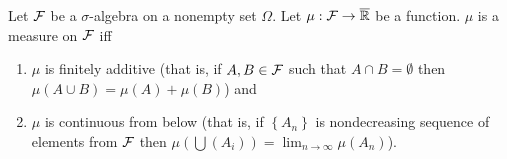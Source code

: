 \begin{theorem}
    Let ${\cal F}$ be a $\sigma$-algebra on a nonempty set $\Omega$. Let $\mu : {\cal F} \to \overline {\mathbb R}$ be a function. $\mu$ is a measure on ${\cal F}$ iff 
	\begin{enumerate}
	    \item$\mu$ is finitely additive (that is, if $A,B \in {\cal F}$ such that $A\cap B =\emptyset$ then $\mu (A \cup B) = \mu (A) + \mu (B)$) and 
	    \item $\mu$ is continuous from below (that is, if $\left\{ A_n \right\}$ is nondecreasing sequence of elements from ${\cal F}$ then $\mu\left( \bigcup \left( A_i \right) \right) = \lim_{n\to\infty} \mu \left( A_n \right)$).
	    \end{enumerate}
    \label{thm:equiv-measure}
\end{theorem}
